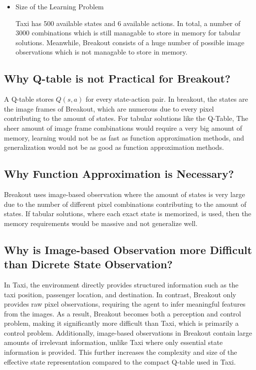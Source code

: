 \documentclass[11pt]{article}
\begin{document}
\begin{itemize}
    \item Size of the Learning Problem
    
    Taxi has 500 available states and 6 available actions. In total, a number of 3000 combinations which is still managable to store in memory for tabular solutions. Meanwhile, Breakout consists of a huge number of possible image observations which is not managable to store in memory.

\end{itemize}

\subsection*{Why Q-table is not Practical for Breakout?}

A Q-table stores $Q(s,a)$ for every state-action pair. In breakout, the states are the image frames of Breakout, which are numerous due to every pixel contributing to the amount of states. For tabular solutions like the Q-Table, The sheer amount of image frame combinations would require a very big amount of memory, learning would not be as fast as function approximation methods, and generalization would not be as good as function approximation methods.

\subsection*{Why Function Approximation is Necessary?}

Breakout uses image-based observation where the amount of states is very large due to the number of different pixel combinations contributing to the amount of states. If tabular solutions, where each exact state is memorized, is used, then the memory requirements would be massive and not generalize well.

\subsection*{Why is Image-based Observation more Difficult than Dicrete State Observation?}

In Taxi, the environment directly provides structured information such as the taxi position, passenger location, and destination. In contrast, Breakout only provides raw pixel observations, requiring the agent to infer meaningful features from the images. As a result, Breakout becomes both a perception and control problem, making it significantly more difficult than Taxi, which is primarily a control problem. Additionally, image-based observations in Breakout contain large amounts of irrelevant information, unlike Taxi where only essential state information is provided. This further increases the complexity and size of the effective state representation compared to the compact Q-table used in Taxi.
\end{document}
